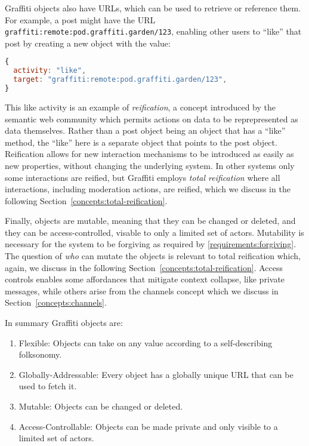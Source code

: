 Graffiti objects also have URLs, which can be used to retrieve or reference them.
For example, a post might have the URL \texttt{graffiti:remote:pod.graffiti.garden/123},
enabling other users to ``like'' that post by creating a new object with the value:

\begin{lstlisting}[language=javascript]
{
  activity: "like",
  target: "graffiti:remote:pod.graffiti.garden/123",
}
\end{lstlisting}

This like activity is an example of \emph{reification},
a concept introduced by the semantic web community
which permits actions on data to be reprepresented as data themselves.
Rather than a post object being an object that has a ``like'' method,
the ``like'' here is a separate object that points to the post object.
Reification allows for new interaction mechanisms to be introduced as easily as new properties,
without changing the underlying system.
In other systems only some interactions are reified,
but Graffiti employs \emph{total reification} where
all interactions, including moderation actions, are reified,
which we discuss in the following
Section~\ref{concepts:total-reification}.


Finally, objects are mutable, meaning that they can be changed or deleted,
and they can be access-controlled, visable to only a limited set of actors.
Mutability is necessary for the system to be forgiving as required by \ref{requirements:forgiving}.
The question of \emph{who} can mutate the objects is relevant to
total reification which,
again, we discuss in the following
Section~\ref{concepts:total-reification}.
Access controls enables some affordances that mitigate context collapse,
like private messages, while others arise from the channels concept
which we discuss in Section~\ref{concepts:channels}.

In summary Graffiti objects are:

\begin{enumerate}
\item
Flexible: Objects can take on any value according to a self-describing folksonomy.
\item
Globally-Addressable: Every object has a globally unique URL that can be used to fetch it.
\item
Mutable: Objects can be changed or deleted.
\item
Access-Controllable: Objects can be made private and only visible to a limited set of actors.
\end{enumerate}

